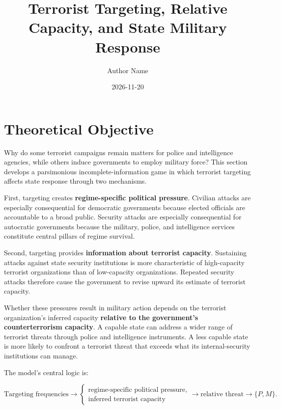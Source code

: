 \documentclass[
  letterpaper,
  DIV=11,
  numbers=noendperiod]{scrartcl}
\title{Terrorist Targeting, Relative Capacity, and State Military
Response}
\author{Author Name}
\date{2026-11-20}
\renewcommand*\contentsname{Table of contents}
\newcommand\contentsname{Table of contents}
\begin{document}
\maketitle

\renewcommand*\contentsname{Table of contents}
{
\setcounter{tocdepth}{3}
\tableofcontents
}

\section{Theoretical Objective}\label{theoretical-objective}

Why do some terrorist campaigns remain matters for police and
intelligence agencies, while others induce governments to employ
military force? This section develops a parsimonious
incomplete-information game in which terrorist targeting affects state
response through two mechanisms.

First, targeting creates \textbf{regime-specific political pressure}.
Civilian attacks are especially consequential for democratic governments
because elected officials are accountable to a broad public. Security
attacks are especially consequential for autocratic governments because
the military, police, and intelligence services constitute central
pillars of regime survival.

Second, targeting provides \textbf{information about terrorist
capacity}. Sustaining attacks against state security institutions is
more characteristic of high-capacity terrorist organizations than of
low-capacity organizations. Repeated security attacks therefore cause
the government to revise upward its estimate of terrorist capacity.

Whether these pressures result in military action depends on the
terrorist organization's inferred capacity \textbf{relative to the
government's counterterrorism capacity}. A capable state can address a
wider range of terrorist threats through police and intelligence
instruments. A less capable state is more likely to confront a terrorist
threat that exceeds what its internal-security institutions can manage.

The model's central logic is:

\[
\boxed{
\text{Targeting frequencies}
\longrightarrow
\begin{cases}
\text{regime-specific political pressure},\\
\text{inferred terrorist capacity}
\end{cases}
\longrightarrow
\text{relative threat}
\longrightarrow
\{P,M\}.
}
\]
\end{document}
